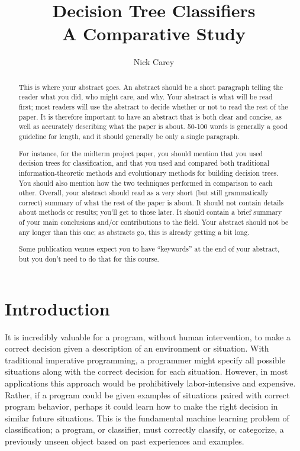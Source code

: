 \documentclass[12pt, letterpaper]{article}
\title{Decision Tree Classifiers \\ A Comparative Study}
\author{Nick Carey}
\begin{document}
\maketitle

\begin{abstract}
This is where your abstract goes.  An abstract should be a short paragraph
telling the reader what you did, who might care, and why.  Your abstract is what
will be read first; most readers will use the abstract to decide whether or not
to read the rest of the paper.  It is therefore important to have an abstract
that is both clear and concise, as well as accurately describing what the paper
is about.  50-100 words is generally a good guideline for length, and it should
generally be only a single paragraph.

For instance, for the midterm project paper, you should mention that you used
decision trees for classification, and that you used and compared both
traditional information-theoretic methods and evolutionary methods for building
decision trees.  You should also mention how the two techniques performed in
comparison to each other.  Overall, your abstract should read as a very short
(but still grammatically correct) summary of what the rest of the paper is
about.  It should not contain details about methods or results; you'll get to
those later.  It should contain a brief summary of your main conclusions and/or
contributions to the field. Your abstract should not be any longer than this
one; as abstracts go, this is already getting a bit long.

Some publication venues expect you to have ``keywords'' at the end of your
abstract, but you don't need to do that for this course.
\end{abstract}

\section{Introduction}
It is incredibly valuable for a program, without human intervention, to make a 
correct decision given a description of an environment or situation. With 
traditional imperative programming, a programmer might specify all
possible situations along with the correct decision for each situation. 
However, in most applications this approach would be prohibitively labor-intensive
and expensive.  Rather, if a program could be given examples of 
situations paired with correct program behavior, perhaps it could learn 
how to make the right decision in similar future situations. This is the fundamental
machine learning problem of classification; a program, or classifier, must correctly classify, or categorize, 
a previously unseen object based on past experiences and examples.
\end{document}
